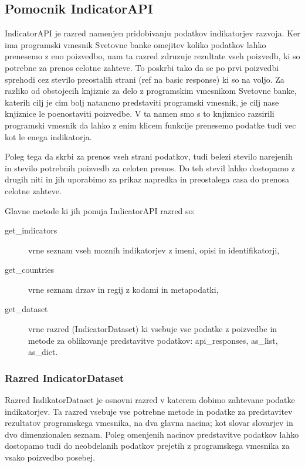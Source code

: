 \subsection{Pomocnik IndicatorAPI}

IndicatorAPI je razred namenjen pridobivanju podatkov indikatorjev razvoja.
Ker ima programski vmesnik Svetovne banke omejitev koliko podatkov lahko
prenesemo z eno poizvedbo, nam ta razred zdruzuje rezultate vseh poizvedb, ki
so potrebne za prenos celotne zahteve. To poskrbi tako da se po prvi poizvedbi
sprehodi cez stevilo preostalih strani (ref na basic response) ki so na voljo. 
Za razliko od obstojecih knjiznic
 za delo z programskim vmesnikom
Svetovne banke, katerih cilj je cim bolj natancno predstaviti programski 
vmesnik, je cilj nase knjiznice le poenostaviti poizvedbe. V ta namen smo s to
knjiznico razsirili programski vmesnik da lahko z enim klicem funkcije 
prenesemo podatke tudi vec kot le enega indikatorja.

Poleg tega da skrbi za prenos vseh strani podatkov, tudi belezi stevilo 
narejenih in stevilo potrebnih poizvedb za celoten prenos. Do teh stevil lahko
dostopamo z drugih niti in jih uporabimo za prikaz napredka in preostalega
casa do prenosa celotne zahteve.

Glavne metode ki jih ponuja IndicatorAPI razred so:

\begin{description}  
\item [get\_indicators] vrne seznam vseh moznih indikatorjev z imeni, opisi in
      identifikatorji,
\item [get\_countries] vrne seznam drzav in regij z kodami in metapodatki,
\item [get\_dataset] vrne razred (IndicatorDataset) ki vsebuje vse podatke z 
      poizvedbe in metode za oblikovanje predstavitve podatkov: api\_responses,
      as\_list, as\_dict.
\end{description}



\subsubsection{Razred IndicatorDataset}

Razred IndikatorDataset je osnovni razred v katerem dobimo zahtevane podatke
indikatorjev. Ta razred vsebuje vse potrebne metode in podatke za predstavitev
rezultatov programskega vmesnika, na dva glavna nacina; kot slovar slovarjev in
dvo dimenzionalen seznam. Poleg omenjenih nacinov predstavitve podatkov lahko
dostopamo tudi do neobdelanih podatkov prejetih z programskega vmesnika za
vsako poizvedbo posebej.


